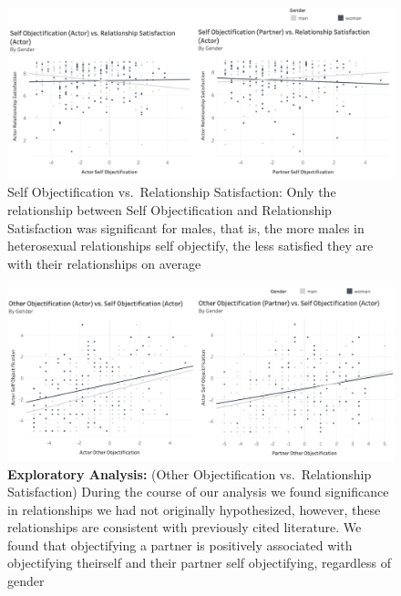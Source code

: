 \documentclass[
  english,
  man,floatsintext]{apa6}
\begin{document}
\begin{figure}
\centering
\includegraphics{Images/SO_vs_RSA.png}
\caption{Self Objectification vs.~Relationship Satisfaction: Only the relationship between Self Objectification and Relationship Satisfaction was significant for males, that is, the more males in heterosexual relationships self objectify, the less satisfied they are with their relationships on average}
\end{figure}

\begin{figure}
\centering
\includegraphics{Images/OO_vs_RSA.png}
\caption{\textbf{Exploratory Analysis:} (Other Objectification vs.~Relationship Satisfaction) During the course of our analysis we found significance in relationships we had not originally hypothesized, however, these relationships are consistent with previously cited literature. We found that objectifying a partner is positively associated with objectifying theirself and their partner self objectifying, regardless of gender}
\end{figure}
\end{document}
